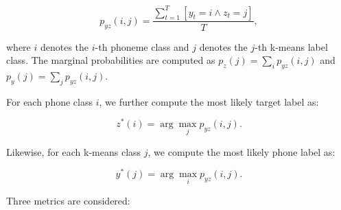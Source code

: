 \begin{equation}
    p_{yz}(i, j) = \dfrac{\sum_{t=1}^T [y_t = i \wedge z_t = j] }{T},
\end{equation}

where $i$ denotes the $i$-th phoneme class and $j$ denotes the $j$-th k-means label class. The marginal probabilities are computed as $p_z(j) = \sum_i p_{yz}(i, j)$ and $p_y(j) = \sum_j p_{yz}(i, j)$.

For each phone class $i$, we further compute the most likely target label as:

\begin{equation}
    z^*(i) = \arg\max_j p_{yz}(i, j).
\end{equation}

Likewise, for each k-means class $j$, we compute the most likely phone label as:

\begin{equation}
    y^*(j) = \arg\max_i p_{yz}(i, j).
\end{equation}

Three metrics are considered:

